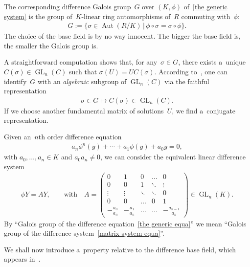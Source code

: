 \documentclass[10pt,a4paper]{amsart}
\numberwithin{equation}{section}
\begin{document}
The corresponding dif\/ference Galois group~$G$ over $(K,\phi)$ of~\eqref{the generic system} is the group of~$K$-linear
ring automorphisms of~$R$ commuting with~$\phi$:
\begin{gather*}
G:=\{\sigma \in \operatorname{Aut}(R/K) \, | \, \phi\circ\sigma=\sigma\circ \phi \}.
\end{gather*}
The choice of the base f\/ield is by no way innocent.
The bigger the base f\/ield is, the smaller the Galois group is.

A straightforward computation shows that, for any~$\sigma {\in} G$, there exists a~unique ${C(\sigma) {\in}
\operatorname{GL}_{n}(C)}$ such that $\sigma(U)=UC(\sigma)$.
According to~\cite[Theorem~1.13]{VdPS97}, one can identify~$G$ with an {\it algebraic} subgroup of
$\operatorname{GL}_{n}(C)$ via the faithful representation
\begin{gather*}
\sigma \in G \mapsto C(\sigma) \in \operatorname{GL}_{n}(C).
\end{gather*}
If we choose another fundamental matrix of solutions~$U$, we f\/ind a~conjugate representation.

\begin{Remark}
Given an~$n$th order dif\/ference equation
\begin{gather}
\label{the generic equa}
a_{n} \phi^{n} (y) + \cdots + a_{1} \phi(y)+a_{0} y=0,
\end{gather}
with $a_{0},\dots,a_{n} \in K$ and $a_{0}a_{n} \neq 0$, we can consider the equivalent linear dif\/ference system
\begin{gather}
\label{matrix system equa}
\phi Y=AY, \qquad \text{with} \quad  A=
\begin{pmatrix}
0&1&0&\dots&0
\\
0&0&1&\ddots&\vdots
\\
\vdots&\vdots&\ddots&\ddots&0
\\
0&0&\dots&0&1
\\
-\frac{a_{0}}{a_{n}}& -\frac{a_{1}}{a_{n}}&\dots & \dots & -\frac{a_{n-1}}{a_{n}}
\end{pmatrix}
\in \operatorname{GL}_{n}(K).
\end{gather}
By ``Galois group of the dif\/ference equation~\eqref{the generic equa}'' we mean ``Galois group of the dif\/ference
system~\eqref{matrix system equa}''.
\end{Remark}

We shall now introduce a~property relative to the dif\/ference base f\/ield, which appears in~\cite[Lemma~1.19]{VdPS97}.
\end{document}
